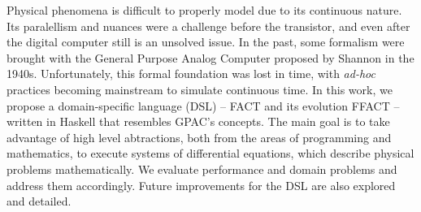 
Physical phenomena is difficult to properly model due to its continuous nature. Its paralellism and nuances were a challenge before the transistor, and even after the digital computer still is an unsolved issue. In the past, some formalism were brought with the General Purpose Analog Computer proposed by Shannon in the 1940s. Unfortunately, this formal foundation was lost in time, with \textit{ad-hoc} practices becoming mainstream to simulate continuous time. In this work, we propose a domain-specific language (DSL) -- FACT and its evolution FFACT -- written in Haskell that resembles GPAC's concepts. The main goal is to take advantage of high level abtractions, both from the areas of programming and mathematics, to execute systems of differential equations, which describe physical problems mathematically. We evaluate performance and domain problems and address them accordingly. Future improvements for the DSL are also explored and detailed.
